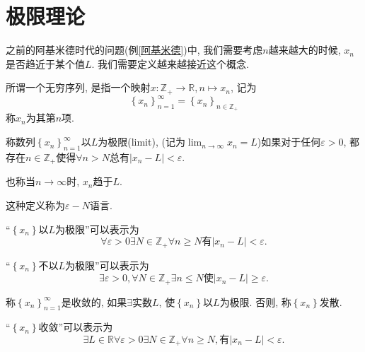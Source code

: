 
\section{极限理论}

之前的阿基米德时代的问题(例\ref{阿基米德})中, 我们需要考虑$n$越来越大的时候, $x_n$是否趋近于某个值$L$. 我们需要定义越来越接近这个概念.

\begin{definition}
    所谓一个无穷序列, 是指一个映射$x\colon \mathbb{Z}_{+} \to \mathbb{R}, n \mapsto x_n$, 记为
    \begin{equation}
      \left\{ x_n \right\} _{n=1}^{\infty} = \left\{ x_n \right\} _{n \in \mathbb{Z}_{+}}
    \end{equation}
    称$x_n$为其第$n$项.
\end{definition}

\begin{definition}
    称数列$\left\{ x_n \right\} _{n=1}^{\infty}$以$L$为极限(limit), (记为$\lim_{n \to \infty}x_n = L$)如果对于任何$\varepsilon> 0$, 都存在$n \in \mathbb{Z}_{+}$使得$\forall n>N$总有$|x_n - L| <\varepsilon$.

    也称当$n\to \infty$时, $x_n$趋于$L$.

    这种定义称为$\varepsilon - N$语言.
\end{definition}
``$\left\{ x_n \right\} $以$L$为极限''可以表示为
\begin{equation}
  \forall \varepsilon > 0 \exists N \in \mathbb{Z}_{+} \forall n\ge N \text{有} |x_n - L| < \varepsilon.
\end{equation}

``$\left\{ x_n \right\} $不以$L$为极限''可以表示为
\begin{equation}
  \exists \varepsilon>0 , \forall N\in \mathbb{Z}_{+} \exists n \le N \text{使}|x_n-L|\ge \varepsilon.
\end{equation}

\begin{definition}
    称$\left\{ x_n \right\} _{n=1}^{\infty}$是收敛的, 如果$\exists $实数$L$, 使$\left\{ x_n \right\} $以$L$为极限.
    否则, 称$\left\{ x_n \right\} $发散.
\end{definition}

``$\left\{ x_n \right\} $收敛''可以表示为
\begin{equation}
  \exists  L \in \mathbb{R} \forall \varepsilon >0 \exists N \in \mathbb{Z}_{+} \forall n \ge  N, \text{有} |x_n-L|<\varepsilon.
\end{equation}

